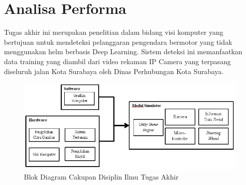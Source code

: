 \section{Analisa Performa}
\vspace{1ex}

	\par Tugas akhir ini merupakan penelitian dalam bidang visi komputer yang bertujuan untuk mendeteksi pelanggaran pengendara bermotor yang tidak menggunakan helm berbasis Deep Learning. Sistem deteksi ini memanfaatkan data training yang diambil dari video rekaman IP Camera yang terpasang diseluruh jalan Kota Surabaya oleh Dinas Perhubungan Kota Surabaya.
\begin{figure}[H]
	\captionsetup{justification=centering}
	\includegraphics[scale=0.55]{img/cakupanTA.JPG}
	\caption{Blok Diagram Cakupan Disiplin Ilmu Tugas Akhir}
	\label{fig: 3_1}
\end{figure}
\vspace{1ex}